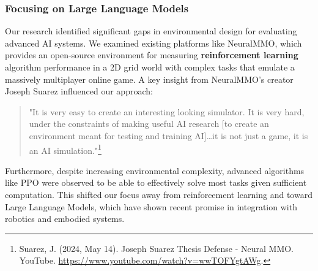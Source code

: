 \documentclass{article}
\begin{document}
\subsubsection{Focusing on Large Language Models}
Our research identified significant gaps in environmental design for evaluating advanced AI systems.
We examined existing platforms like NeuralMMO, which provides an open-source environment for measuring \textbf{reinforcement learning} algorithm performance in a 2D grid world with complex tasks that emulate a massively multiplayer online game.
A key insight from NeuralMMO's creator Joseph Suarez influenced our approach:
\begin{quote}
    "It is very easy to create an interesting looking simulator. It is very hard, under the constraints of making useful AI research [to create an environment meant for testing and training AI]…it is not just a game, it is an AI simulation."\footnote{Suarez, J. (2024, May 14). Joseph Suarez Thesis Defense - Neural MMO. YouTube. \url{https://www.youtube.com/watch?v=wwTOFYgtAWg}.}
\end{quote}
Furthermore, despite increasing environmental complexity, advanced algorithms like PPO were observed to be able to effectively solve most tasks given sufficient computation.
This shifted our focus away from reinforcement learning and toward Large Language Models, which have shown recent promise in integration with robotics and embodied systems.
\end{document}
